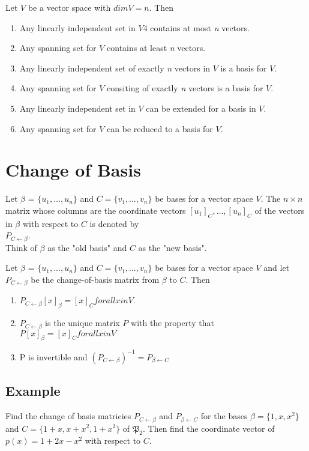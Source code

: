 Let $V$ be a vector space with $dim V = n$. Then
\begin{enumerate}[a]
    \item Any linearly independent set in $V4$ contains at most \textit{n} vectors.
    \item Any spanning set for $V$ contains at least \textit{n} vectors.
    \item Any linearly independent set of exactly \textit{n} vectors in $V$ is a basis for $V$. 
    \item Any spanning set for $V$ consiting of exactly \textit{n} vectors is a basis for $V$.
    \item Any linearly independent set in $V$ can be extended for a basis in $V$.
    \item Any spanning set for $V$ can be reduced to a basis for $V$.
\end{enumerate}

\section*{Change of Basis}
Let $\beta$ = $\{u_1, \dots, u_n\}$ and $C = \{v_1, \dots, v_n\}$ be bases for a vector space $V$. The $n\times n$ matrix whose columns are the coordinate vectors $[u_1]_C, \dots, [u_n]_C$ of the vectors in $\beta$ with respect to $C$ is denoted by\\ $P_{C\leftarrow \beta}$.\\
Think of $\beta$ as the "old basis" and $C$ as the "new basis".

Let $\beta$ = $\{u_1, \dots, u_n\}$ and $C = \{v_1, \dots, v_n\}$ be bases for a vector space $V$ and let $P_{C\leftarrow \beta}$ be the change-of-basis matrix from $\beta$ to $C$. Then
\begin{enumerate}[a]
    \item $P_{C\leftarrow \beta}[x]_\beta = [x]_C for all x in V$.
    \item $P_{C\leftarrow \beta}$ is the unique matrix $P$ with the property that $P[x]_\beta = [x]_C for all x in V$
    \item P is invertible and $(P_{C\leftarrow \beta})^{-1} = P_{\beta \leftarrow C}$
\end{enumerate}
\subsection*{Example}
Find the change of basis matricies $P_{C\leftarrow \beta}$ and $P_{\beta \leftarrow C}$ for the bases $\beta = \{1, x, x^2\}$ and $C = \{1+x, x+x^2, 1+x^2\}$ of $\mathfrak{P}_2$. Then find the coordinate vector of $p(x) = 1+2x-x^2$ with respect to $C$.
